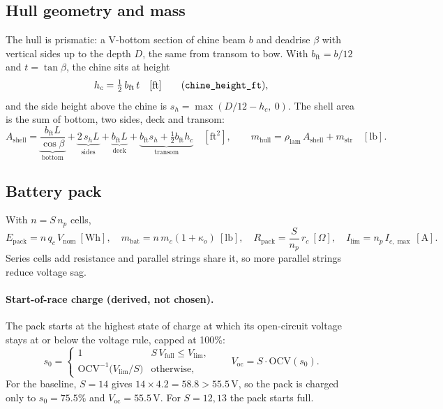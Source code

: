 \documentclass[11pt,a4paper]{article}
\renewcommand{\_}{\textunderscore\allowbreak}
\newcommand{\code}[1]{\texttt{#1}}
\newcommand{\Epack}{E_{\mathrm{pack}}}
\newcommand{\Voc}{V_{\mathrm{oc}}}
\newcommand{\Rpack}{R_{\mathrm{pack}}}
\begin{document}
\subsection{Hull geometry and mass}
The hull is prismatic: a V-bottom section of chine beam $b$ and deadrise $\beta$ with vertical sides up to the depth $D$,
the same from transom to bow. With $b_{\mathrm{ft}}=b/12$ and $t=\tan\beta$, the chine sits at height
\begin{equation}
  h_c = \tfrac12\, b_{\mathrm{ft}}\, t \quad[\mathrm{ft}] \qquad (\code{chine\_height\_ft}),
  \label{eq:chine}
\end{equation}
and the side height above the chine is $s_h = \max(D/12 - h_c,\ 0)$. The shell area is the sum of bottom, two sides, deck and transom:
\begin{equation}
  A_{\mathrm{shell}} = \underbrace{\frac{b_{\mathrm{ft}}L}{\cos\beta}}_{\text{bottom}}
  + \underbrace{2\,s_h L}_{\text{sides}} + \underbrace{b_{\mathrm{ft}}L}_{\text{deck}}
  + \underbrace{b_{\mathrm{ft}}s_h + \tfrac12 b_{\mathrm{ft}}h_c}_{\text{transom}} \quad[\mathrm{ft}^2],
  \qquad
  m_{\mathrm{hull}} = \rho_{\mathrm{lam}}\,A_{\mathrm{shell}} + m_{\mathrm{str}} \quad[\mathrm{lb}].
  \label{eq:hull}
\end{equation}

\subsection{Battery pack}
With $n = S\,n_p$ cells,
\begin{equation}
  \Epack = n\,q_c\,V_{\mathrm{nom}}\ [\mathrm{Wh}], \quad
  m_{\mathrm{bat}} = n\,m_c(1+\kappa_o)\ [\mathrm{lb}], \quad
  \Rpack = \frac{S}{n_p}\,r_c\ [\Omega], \quad
  I_{\lim} = n_p\,I_{c,\max}\ [\mathrm A].
  \label{eq:pack}
\end{equation}
Series cells add resistance and parallel strings share it, so more parallel strings reduce voltage sag.

\paragraph{Start-of-race charge (derived, not chosen).}
The pack starts at the highest state of charge at which its open-circuit voltage stays at or below the voltage rule, capped at 100\%:
\begin{equation}
  s_0 =
  \begin{cases}
    1 & S\,V_{\mathrm{full}} \le V_{\lim},\\[2pt]
    \mathrm{OCV}^{-1}\!\bigl(V_{\lim}/S\bigr) & \text{otherwise},
  \end{cases}
  \qquad
  \Voc = S\cdot\mathrm{OCV}(s_0).
  \label{eq:soc0}
\end{equation}
For the baseline, $S=14$ gives $14\times4.2=58.8>55.5\,\mathrm V$, so the pack is charged only to $s_0=75.5\%$ and $\Voc=55.5\,\mathrm V$.
For $S=12,13$ the pack starts full.
\end{document}

